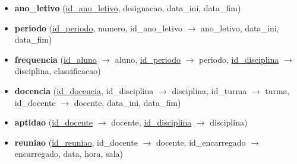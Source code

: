 \documentclass[12pt,a4paper,reqno]{report}
\numberwithin{figure}{section}
\numberwithin{equation}{section}
\begin{document}
\begin{itemize}
\item \textbf{ano\_letivo} (\underline{id\_ano\_letivo}, designacao, data\_ini, data\_fim)

\item \textbf{periodo} (\underline{id\_periodo}, numero, id\_ano\_letivo $\rightarrow$ ano\_letivo, data\_ini, data\_fim)

\item \textbf{frequencia} (\underline{id\_aluno} $\rightarrow$ aluno, \underline{id\_periodo} $\rightarrow$ periodo, \underline{id\_disciplina} $\rightarrow$ disciplina, classificacao)

\item \textbf{docencia} (\underline{id\_docencia}, id\_disciplina $\rightarrow$ disciplina, id\_turma $\rightarrow$ turma, id\_docente $\rightarrow$ docente, data\_ini, data\_fim)

\item \textbf{aptidao} (\underline{id\_docente} $\rightarrow$ docente, \underline{id\_disciplina} $\rightarrow$ disciplina)

\item \textbf{reuniao} (\underline{id\_reuniao}, id\_docente $\rightarrow$ docente, id\_encarregado $\rightarrow$ encarregado, data, hora, sala)

\end{itemize}
\end{document}
